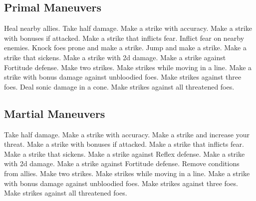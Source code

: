 
\small
\subsection{Primal Maneuvers}\label{Primal Maneuvers}
\begin{spelllist}
 Heal nearby allies.
 Take half damage.
 Make a strike with  accuracy.
 Make a strike with bonuses if attacked.
 Make a strike that inflicts fear.
 Inflict fear on nearby enemies.
 Knock foes prone and make a strike.
 Jump and make a strike.
 Make a strike that sickens.
 Make a strike with \plus2d damage.
 Make a strike against Fortitude defense.
 Make two strikes.
 Make strikes while moving in a line.
 Make a strike with bonus damage against unbloodied foes.
 Make strikes against three foes.
 Deal sonic damage in a cone.
 Make strikes against all threatened foes.
\end{spelllist}



\small
\subsection{Martial Maneuvers}\label{Martial Maneuvers}
\begin{spelllist}
 Take half damage.
 Make a strike with  accuracy.
 Make a strike and increase your threat.
 Make a strike with bonuses if attacked.
 Make a strike that inflicts fear.
 Make a strike that sickens.
 Make a strike against Reflex defense.
 Make a strike with \plus2d damage.
 Make a strike against Fortitude defense.
 Remove conditions from allies.
 Make two strikes.
 Make strikes while moving in a line.
 Make a strike with bonus damage against unbloodied foes.
 Make strikes against three foes.
 Make strikes against all threatened foes.
\end{spelllist}



